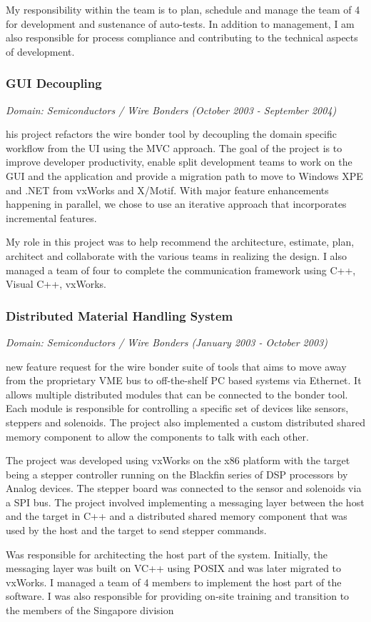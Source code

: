 \documentclass[a4paper,12pt]{article}
\newcommand\cvprojectentry[5]{
  \subsubsection*{#1}
  
  \vspace{-7pt}
  
  \it{Domain: #2}\normalfont{} \quad (#3 - #4)
  
}
\begin{document}
My responsibility within the team is to plan, schedule and manage the
team of 4 for development and sustenance of auto-tests. In addition
to management, I am also responsible for process compliance and
contributing to the technical aspects of development.
 
\cvprojectentry{GUI Decoupling}{Semiconductors / Wire Bonders}{October 2003}{September 2004}

This project refactors the wire bonder tool by decoupling the domain
specific workflow from the UI using the MVC approach. The goal of the
project is to improve developer productivity, enable split development
teams to work on the GUI and the application and provide a migration
path to move to Windows XPE and .NET from vxWorks and X/Motif. With
major feature enhancements happening in parallel, we chose to use an
iterative approach that incorporates incremental features.
 
My role in this project was to help recommend the architecture,
estimate, plan, architect and collaborate with the various teams in
realizing the design. I also managed a team of four to complete the
communication framework using C++, Visual C++, vxWorks.
 
\cvprojectentry{Distributed Material Handling System}{Semiconductors / Wire Bonders}{January 2003}{October 2003}

A new feature request for the wire bonder suite of tools that aims to
move away from the proprietary VME bus to off-the-shelf PC based
systems via Ethernet. It allows multiple distributed modules that can
be connected to the bonder tool. Each module is responsible for
controlling a specific set of devices like sensors, steppers and
solenoids. The project also implemented a custom distributed shared
memory component to allow the components to talk with each other.
 
The project was developed using vxWorks on the x86 platform with the
target being a stepper controller running on the Blackfin series of
DSP processors by Analog devices. The stepper board was connected to
the sensor and solenoids via a SPI bus. The project involved
implementing a messaging layer between the host and the target in C++
and a distributed shared memory component that was used by the host
and the target to send stepper commands.
 
Was responsible for architecting the host part of the
system. Initially, the messaging layer was built on VC++ using POSIX
and was later migrated to vxWorks. I managed a team of 4 members to
implement the host part of the software. I was also responsible for
providing on-site training and transition to the members of the
Singapore division
\end{document}
